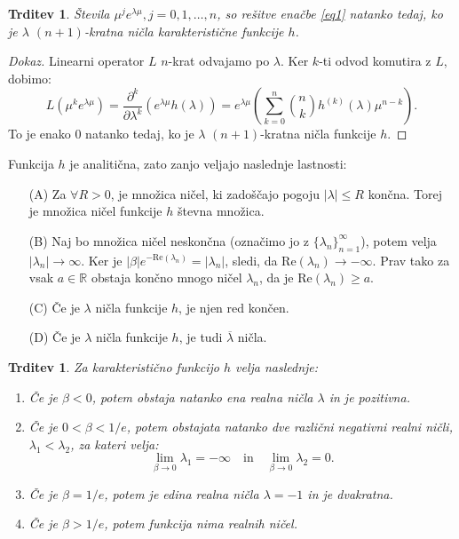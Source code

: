 \documentclass[12pt,a4paper]{amsart}
\theoremstyle{definition} %
\theoremstyle{plain} %
\newtheorem{trditev}[definicija]{Trditev}
\newcommand{\R}{\mathbb R}
\begin{document}
\begin{trditev}
    Števila $\mu^{j}e^{\lambda \mu}, j=0,1,\dots,n$, so rešitve enačbe \eqref{eq1} natanko
    tedaj, ko je $\lambda$ $(n+1)$-kratna ničla karakteristične funkcije $h$.
\end{trditev}

\begin{proof}[Dokaz]
    Linearni operator $L$ $n$-krat odvajamo po $\lambda$. Ker $k$-ti odvod komutira z $L$, dobimo:
    \[L(\mu^{k}e^{\lambda\mu})=\frac{\partial^k}{\partial\lambda^k}(e^{\lambda\mu}h(\lambda))
    =e^{\lambda\mu}\left(\sum_{k=0}^{n}\binom{n}{k}h^{(k)}(\lambda)\mu^{n-k}\right). \]
    To je enako 0 natanko tedaj, ko je $\lambda$ $(n+1)$-kratna ničla funkcije $h$.
\end{proof}

\noindent Funkcija $h$ je analitična, zato zanjo veljajo naslednje lastnosti:
\begin{enumerate}
    \item[(A)] Za $\forall R > 0$, je množica ničel, ki zadoščajo pogoju $|\lambda|\leq R$ končna. Torej je
            množica ničel funkcije $h$ števna množica.
    \item[(B)] Naj bo množica ničel neskončna (označimo jo z $\{\lambda_{n}\}_{n=1}^{\infty}$), potem velja
    $|\lambda_{n}| \to \infty$. Ker je $|\beta|e^{-\text{Re}(\lambda_{n})}=|\lambda_n|$, sledi, da
    $\text{Re}(\lambda_n) \to -\infty$. Prav tako za vsak $a \in \R$ obstaja končno mnogo ničel $\lambda_n$,
    da je $\text{Re}(\lambda_n) \geq a$. 
    \item[(C)] Če je $\lambda$ ničla funkcije $h$, je njen red končen.
    \item[(D)] Če je $\lambda$ ničla funkcije $h$, je tudi $\overline{\lambda}$ ničla.
\end{enumerate}


\begin{trditev}
    Za karakteristično funkcijo $h$ velja naslednje:
    \begin{enumerate}
        \item Če je $\beta < 0$, potem obstaja natanko ena realna ničla $\lambda$ in je pozitivna.
        \item Če je $0 < \beta < 1/e$, potem obstajata natanko dve različni negativni realni
         ničli, $\lambda_{1} < \lambda_{2}$, za kateri velja:
         \[ \lim_{\beta \to 0}\lambda_{1}=-\infty \quad \text{in} \quad \lim_{\beta \to 0}\lambda_{2}=0. \]
        \item Če je $\beta = 1/e$, potem je edina realna ničla $\lambda = -1$ in je dvakratna.
        \item Če je $\beta > 1/e$, potem funkcija nima realnih ničel.
    \end{enumerate}
\end{trditev}
\end{document}
